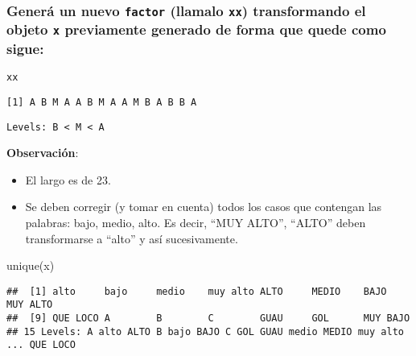 \documentclass[
]{article}
\newenvironment{Shaded}{\begin{snugshade}}{\end{snugshade}}
\newcommand{\FunctionTok}[1]{\textcolor[rgb]{0.00,0.00,0.00}{#1}}
\newcommand{\NormalTok}[1]{#1}
\providecommand{\tightlist}{%
  \setlength{\itemsep}{0pt}\setlength{\parskip}{0pt}}
\begin{document}
\hypertarget{generuxe1-un-nuevo-factor-llamalo-xx-transformando-el-objeto-x-previamente-generado-de-forma-que-quede-como-sigue}{%
\subsubsection{\texorpdfstring{Generá un nuevo \texttt{factor} (llamalo
\texttt{xx}) transformando el objeto \texttt{x} previamente generado de
forma que quede como
sigue:}{Generá un nuevo factor (llamalo xx) transformando el objeto x previamente generado de forma que quede como sigue:}}\label{generuxe1-un-nuevo-factor-llamalo-xx-transformando-el-objeto-x-previamente-generado-de-forma-que-quede-como-sigue}}

\texttt{xx}

\texttt{{[}1{]}\ A\ B\ M\ A\ A\ B\ M\ A\ A\ M\ B\ A\ B\ B\ A}

\texttt{Levels:\ B\ \textless{}\ M\ \textless{}\ A}

\textbf{Observación}:

\begin{itemize}
\tightlist
\item
  El largo es de 23.
\item
  Se deben corregir (y tomar en cuenta) todos los casos que contengan
  las palabras: bajo, medio, alto. Es decir, ``MUY ALTO'', ``ALTO''
  deben transformarse a ``alto'' y así sucesivamente.
\end{itemize}

\begin{Shaded}
\begin{Highlighting}[]
\FunctionTok{unique}\NormalTok{(x)}
\end{Highlighting}
\end{Shaded}

\begin{verbatim}
##  [1] alto     bajo     medio    muy alto ALTO     MEDIO    BAJO     MUY ALTO
##  [9] QUE LOCO A        B        C        GUAU     GOL      MUY BAJO
## 15 Levels: A alto ALTO B bajo BAJO C GOL GUAU medio MEDIO muy alto ... QUE LOCO
\end{verbatim}
\end{document}
